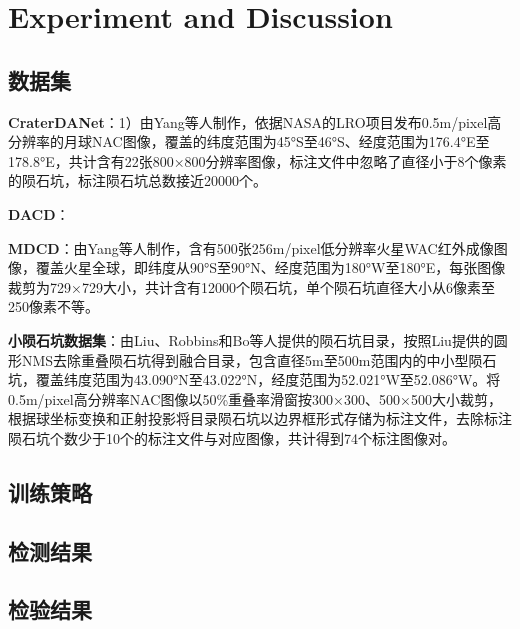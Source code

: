 \section{Experiment and Discussion}
\label{sec:experiment and discussion}
\subsection{数据集}
\textbf{CraterDANet}：1）由Yang\cite{yangCraterDANetConvolutionalNeural2022}等人制作，依据NASA的LRO项目发布0.5m/pixel高分辨率的月球NAC图像，覆盖的纬度范围为45°S至46°S、经度范围为176.4°E至178.8°E，共计含有22张800×800分辨率图像，标注文件中忽略了直径小于8个像素的陨石坑，标注陨石坑总数接近20000个。
\par\textbf{DACD}：
\par\textbf{MDCD}：由Yang\cite{yangHighresolutionFeaturePyramid2022}等人制作，含有500张256m/pixel低分辨率火星WAC红外成像图像，覆盖火星全球，即纬度从90°S至90°N、经度范围为180°W至180°E，每张图像裁剪为729×729大小，共计含有12000个陨石坑，单个陨石坑直径大小从6像素至250像素不等。
\par\textbf{小陨石坑数据集}：由Liu\cite{liuIdentificationLunarCraters2024}、Robbins\cite{robbinsNewGlobalDatabase2019}和Bo\cite{boCatalogueMeterscaleImpact2022}等人提供的陨石坑目录，按照Liu\cite{liuIdentificationLunarCraters2024}提供的圆形NMS去除重叠陨石坑得到融合目录，包含直径5m至500m范围内的中小型陨石坑，覆盖纬度范围为43.090°N至43.022°N，经度范围为52.021°W至52.086°W。将0.5m/pixel高分辨率NAC图像以50\%重叠率滑窗按300×300、500×500大小裁剪，根据球坐标变换和正射投影将目录陨石坑以边界框形式存储为标注文件，去除标注陨石坑个数少于10个的标注文件与对应图像，共计得到74个标注图像对。
\subsection{训练策略}
\subsection{检测结果}
\subsection{检验结果}